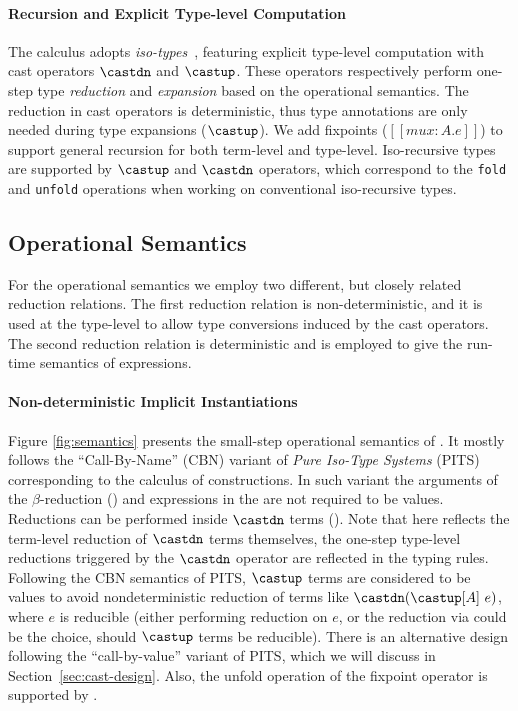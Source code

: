 \paragraph{Recursion and Explicit Type-level Computation}
\label{sec:cast}
The \name calculus adopts \emph{iso-types}~\citep{isotype,yang2019pure},
featuring explicit type-level computation with cast operators
$\castdn$ and $\castup$. These operators respectively perform one-step
type \emph{reduction} and \emph{expansion} based on the operational semantics.
The reduction in cast operators is deterministic, thus type
annotations are only needed during type expansions ($\castup$). We add
fixpoints ($[[mu x : A. e]]$) to support general recursion for both
term-level and type-level. Iso-recursive types are supported by $\castup$ and
$\castdn$ operators, which correspond to the
\verb|fold| and \verb|unfold| operations when working on conventional iso-recursive types.

\subsection{Operational Semantics}\label{subsec:semantics}

For the operational semantics we employ two different, but closely related
reduction relations. The first reduction relation is non-deterministic, and
it is used at the type-level to allow type conversions induced
by the cast operators. The second reduction relation is deterministic and
is employed to give the run-time semantics of expressions.

\paragraph{Non-deterministic Implicit Instantiations}
Figure \ref{fig:semantics} presents the small-step operational semantics of \name.
It mostly follows the ``Call-By-Name'' (CBN) variant of \emph{Pure Iso-Type Systems} (PITS)
~\citep{yang2019pure} corresponding to the calculus of constructions. In such variant
the arguments of the $\beta$-reduction () and expressions in
the  are not required to be values.
Reductions can be performed inside $\castdn$ terms ().
Note that here  reflects the term-level reduction of $\castdn$ terms themselves,
the one-step type-level reductions triggered by the $\castdn$ operator are
reflected in the typing rules.
Following the CBN semantics of PITS, $\castup$ terms are considered to be values
to avoid nondeterministic reduction of terms like $\castdn (\castup [A] ~e)$,
where $e$ is reducible (either performing reduction on $e$, or the reduction via
 could be the choice, should $\castup$ terms be reducible).
There is an alternative design following the ``call-by-value'' variant of PITS, which
we will discuss in Section~\ref{sec:cast-design}.
Also, the unfold operation of the fixpoint operator is supported by .


